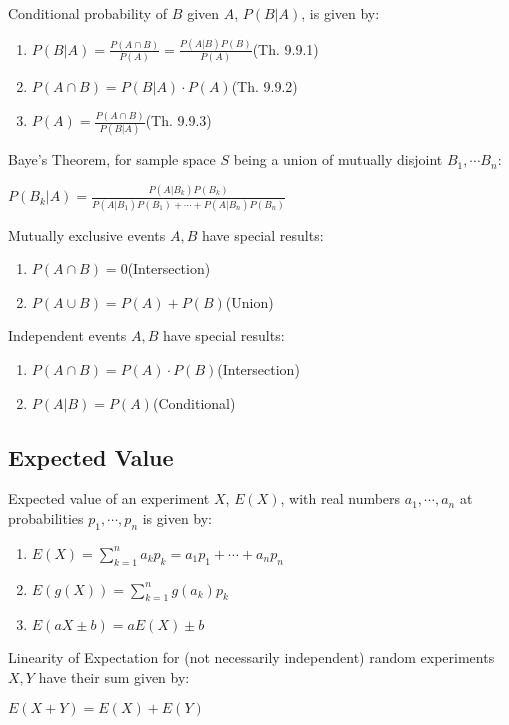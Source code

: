 \documentclass[12pt, a4paper]{article}
\begin{document}
\begin{multicols*}{3}
Conditional probability of $B$ given $A$, $P(B|A)$, is given by:
\begin{enumerate}[\roman*.]
  \item $P(B|A) = \displaystyle\frac{P(A\cap B)}{P(A)} = \frac{P(A|B)P(B)}{P(A)}$\hfill(Th. 9.9.1)
  \item $P(A\cap B) = P(B|A) \cdot P(A)$\hfill(Th. 9.9.2)
  \item $P(A) = \displaystyle\frac{P(A\cap B)}{P(B|A)}$\hfill(Th. 9.9.3)
\end{enumerate}

Baye's Theorem, for sample space $S$ being a union of mutually disjoint $B_1, \cdots B_n$:\\
{\centering
  $\displaystyle P(B_k|A) = \frac{P(A|B_k)P(B_k)}{P(A|B_1)P(B_1) + \cdots + P(A|B_n)P(B_n)}$
\par}
Mutually exclusive events $A,B$ have special results:
\begin{enumerate}[\roman*.]
  \item $P(A\cap B) = 0$\hfill(Intersection)
  \item $P(A\cup B) = P(A) + P(B)$\hfill(Union)
\end{enumerate}

Independent events $A,B$ have special results:
\begin{enumerate}[\roman*.]
  \item $P(A\cap B) = P(A)\cdot P(B)$\hfill(Intersection)
  \item $P(A|B) = P(A)$\hfill(Conditional)
\end{enumerate}
\subsection{Expected Value}
Expected value of an experiment $X$, $E(X)$, with real numbers $a_1,\cdots,a_n$ at probabilities $p_1,\cdots,p_n$ is given by:
\begin{enumerate}[\roman*.]
  \item $E(X) = \displaystyle\sum^n_{k=1} a_kp_k = a_1p_1 + \cdots + a_np_n$
  \item $E(g(X)) = \displaystyle \sum^n_{k=1} g(a_k)p_k$
  \item $E(aX\pm b) = aE(X)\pm b$
\end{enumerate}

Linearity of Expectation for (not necessarily independent) random experiments $X, Y$ have their sum given by:\\
{\centering
  $E(X+Y) = E(X) + E(Y)$
\par}


\end{multicols*}
\end{document}
